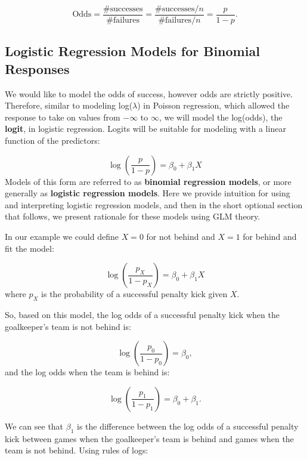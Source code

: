 \documentclass[
]{krantz}
\begin{document}
\[\textrm{Odds} = \frac{\# \textrm{successes}}{\# \textrm{failures}}=
\frac{\# \textrm{successes}/n}{\# \textrm{failures}/n}=
\frac{p}{1-p}.\]

\hypertarget{logistic-regression-models-for-binomial-responses}{%
\subsection{Logistic Regression Models for Binomial Responses}\label{logistic-regression-models-for-binomial-responses}}

We would like to model the odds of success, however odds are strictly positive. Therefore, similar to modeling log(\(\lambda\)) in Poisson regression, which allowed the response to take on values from \(-\infty\) to \(\infty\), we will model the log(odds), the \textbf{logit}, in logistic regression. Logits will be suitable for modeling with a linear function of the predictors:

\begin{equation*}
\log\left(\frac{p}{1 - p}\right)=\beta_0+\beta_1X 
 \end{equation*}
Models of this form are referred to as \textbf{binomial regression models}, or more generally as \textbf{logistic regression models}.  Here we provide intuition for using and interpreting logistic regression models, and then in the short optional section that follows, we present rationale for these models using GLM theory.

In our example we could define \(X=0\) for not behind and \(X=1\) for behind and fit the model:

\begin{equation}
\log\left(\frac{p_X}{1-p_X}\right)=\beta_0 +\beta_1X
\label{eq:logitXform}
\end{equation}
where \(p_X\) is the probability of a successful penalty kick given \(X\).

So, based on this model, the log odds of a successful penalty kick when the goalkeeper's team is not behind is:

\[
\log\left(\frac{p_0}{1-p_0}\right) =\beta_0 \nonumber,
\]
and the log odds when the team is behind is:

\[
\log\left(\frac{p_1}{1-p_1}\right)=\beta_0+\beta_1. \nonumber
\]

We can see that \(\beta_1\) is the difference between the log odds of a successful penalty kick between games when the goalkeeper's team is behind and games when the team is not behind. Using rules of logs:
\end{document}
